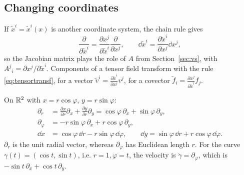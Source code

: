 \subsection{Changing coordinates}\label{sec:changecoords}
If $\tilde x^i=\tilde x^i(x)$ is another coordinate system, the chain rule gives
\begin{equation}\label{eq:basistransf}
\frac{\partial}{\partial\tilde x^i}=\frac{\partial x^j}{\partial\tilde x^i}\frac{\partial}{\partial x^j},\qquad
\dd\tilde x^i=\frac{\partial\tilde x^i}{\partial x^j}\dd x^j,
\end{equation}
so the Jacobian matrix plays the role of $A$ from Section~\ref{sec:vs}, with $A^j{}_i=\partial x^j/\partial\tilde x^i$. Components of a tensor field transform with the rule \eqref{eq:tensortransf}, \eg for a vector $\tilde v^i=\frac{\partial\tilde x^i}{\partial x^j}v^j$, for a covector $\tilde f_i=\frac{\partial x^j}{\partial\tilde x^i}f_j$.

\begin{example}\label{ex:polarbasis}
On $\mathbb{R}^2$ with $x=r\cos\varphi$, $y=r\sin\varphi$:
\begin{align*}
\partial_r&=\frac{\partial x}{\partial r}\partial_x+\frac{\partial y}{\partial r}\partial_y=\cos\varphi\,\partial_x+\sin\varphi\,\partial_y,\\
\partial_\varphi&=-r\sin\varphi\,\partial_x+r\cos\varphi\,\partial_y,\\
\dd x&=\cos\varphi\,\dd r-r\sin\varphi\,\dd\varphi,\qquad \dd y=\sin\varphi\,\dd r+r\cos\varphi\,\dd\varphi .
\end{align*}
$\partial_r$ is the unit radial vector, whereas $\partial_\varphi$ has Euclidean length $r$. For the curve $\gamma(t)=(\cos t,\sin t)$, i.e. $r=1,\varphi=t$, the velocity is $\dot\gamma=\partial_\varphi$, which is $-\sin t\,\partial_x+\cos t\,\partial_y$. \checkmark
\end{example}

